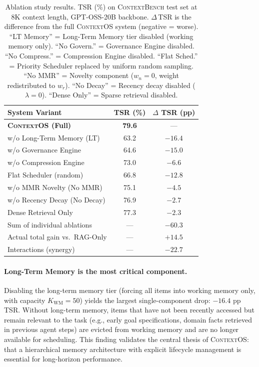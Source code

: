 \documentclass[review,12pt]{elsarticle}
\newcommand{\contextos}{\textsc{ContextOS}}
\newcommand{\contextbench}{\textsc{ContextBench}}
\begin{document}
\begin{table}[t]
\centering
\caption{Ablation study results.  TSR (\%) on \contextbench{} test set
  at 8K context length, GPT-OSS-20B backbone.  $\Delta$\,TSR is the difference
  from the full \contextos{} system (negative = worse).  ``LT Memory'' = Long-Term
  Memory tier disabled (working memory only).  ``No Govern.'' = Governance
  Engine disabled.  ``No Compress.'' = Compression Engine disabled.
  ``Flat Sched.'' = Priority Scheduler replaced by uniform random sampling.
  ``No MMR'' = Novelty component ($w_n = 0$, weight redistributed to $w_r$).
  ``No Decay'' = Recency decay disabled ($\lambda = 0$).
  ``Dense Only'' = Sparse retrieval disabled.}
\label{tab:ablation}
\begin{tabular}{lcc}
\toprule
\textbf{System Variant} & \textbf{TSR (\%)} & \textbf{$\Delta$ TSR (pp)} \\
\midrule
\textbf{\contextos{} (Full)}  & \textbf{79.6} & --- \\
\midrule
w/o Long-Term Memory (LT)     & 63.2 & $-16.4$ \\
w/o Governance Engine         & 64.6 & $-15.0$ \\
w/o Compression Engine        & 73.0 & $-6.6$  \\
Flat Scheduler (random)       & 66.8 & $-12.8$ \\
w/o MMR Novelty (No MMR)      & 75.1 & $-4.5$  \\
w/o Recency Decay (No Decay)  & 76.9 & $-2.7$  \\
Dense Retrieval Only          & 77.3 & $-2.3$  \\
\midrule
Sum of individual ablations   &  ---  & $-60.3$ \\
Actual total gain vs.\ RAG-Only & --- & $+14.5$ \\
Interactions (synergy)        &  ---  & $-22.7$ \\
\bottomrule
\end{tabular}
\end{table}

\paragraph{Long-Term Memory is the most critical component.}
Disabling the long-term memory tier (forcing all items into working memory only,
with capacity $K_{\text{WM}} = 50$) yields the largest single-component drop:
$-16.4$ pp TSR.  Without long-term memory, items that have not been recently
accessed but remain relevant to the task (e.g., early goal specifications,
domain facts retrieved in previous agent steps) are evicted from working
memory and are no longer available for scheduling.  This finding validates
the central thesis of \contextos{}: that a hierarchical memory architecture
with explicit lifecycle management is essential for long-horizon performance.
\end{document}
